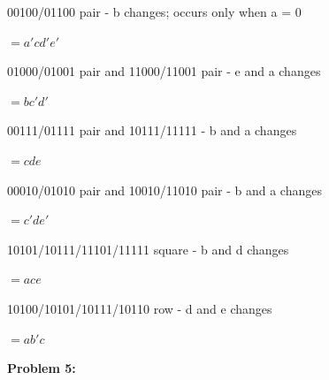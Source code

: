 \documentclass{article}
\begin{document}
    00100/01100 pair - b changes; occurs only when a = 0

    \quad\quad $= a'cd'e'$

    01000/01001 pair and 11000/11001 pair - e and a changes

    \quad\quad $= bc'd'$

    00111/01111 pair and 10111/11111 - b and a changes

    \quad\quad $=cde$

    00010/01010 pair and 10010/11010 pair - b and a changes

    \quad\quad $= c'de'$

    10101/10111/11101/11111 square - b and d changes

    \quad\quad $= ace$

    10100/10101/10111/10110 row - d and e changes

    \quad\quad $=ab'c$



    \textbf{Problem 5:}
\end{document}
